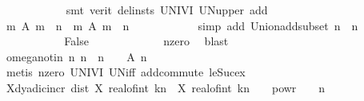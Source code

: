 \begin{isabellebody}
\ \ \ \ \ \ \ \ \ \ \isamarkupfalse%
\ {\isacharparenleft}{\kern0pt}smt\ {\isacharparenleft}{\kern0pt}verit{\isacharcomma}{\kern0pt}\ del{\isacharunderscore}{\kern0pt}insts{\isacharparenright}{\kern0pt}\ UNIV{\isacharunderscore}{\kern0pt}I\ UN{\isacharunderscore}{\kern0pt}upper\ add{\isacharunderscore}{\kern0pt}{}{\isacharparenright}{\kern0pt}\isanewline
\ \ \ \ \ \ \ \ \isamarkupfalse%
\ \isamarkupfalse%
\ {\isachardoublequoteopen}{\isacharparenleft}{\kern0pt}{\isasymUnion}m{\isachardot}{\kern0pt}\ A\ {\isacharparenleft}{\kern0pt}m\ {\isacharplus}{\kern0pt}\ n{\isacharparenright}{\kern0pt}{\isacharparenright}{\kern0pt}\ {\isasymsubseteq}\ {\isacharparenleft}{\kern0pt}{\isasymUnion}m{\isachardot}{\kern0pt}\ A\ {\isacharparenleft}{\kern0pt}m\ {\isacharplus}{\kern0pt}\ n\isanewline
\ \ \ \ \ \ \ \ \ \ \isamarkupfalse%
\ {\isacharparenleft}{\kern0pt}simp\ add{\isacharcolon}{\kern0pt}\ Union{\isacharunderscore}{\kern0pt}add{\isacharunderscore}{\kern0pt}subset\ {\isacartoucheopen}n\ {\isasymle}\ n{\isacartoucheclose}{\isacharparenright}{\kern0pt}\isanewline
\ \ \ \ \ \ \ \ \isamarkupfalse%
\ \isamarkupfalse%
\ False\isanewline
\ \ \ \ \ \ \ \ \ \ \isamarkupfalse%
\ {\isasymomega}\ n{\isacharunderscore}{\kern0pt}zero\ \isamarkupfalse%
\ blast\isanewline
\ \ \ \ \ \ \isamarkupfalse%
\isanewline
\ \ \ \ \ \ \isamarkupfalse%
\ omega{\isacharunderscore}{\kern0pt}notin{\isacharcolon}{\kern0pt}\ {\isachardoublequoteopen}{\isasymAnd}n{\isachardot}{\kern0pt}\ n\ {\isasymge}\ n\ {\isasymLongrightarrow}\ {\isasymomega}\ {\isasymnotin}\ A\ n{\isachardoublequoteclose}\isanewline
\ \ \ \ \ \ \ \ \isamarkupfalse%
\ {\isacharparenleft}{\kern0pt}metis\ n{\isacharunderscore}{\kern0pt}zero\ UNIV{\isacharunderscore}{\kern0pt}I\ UN{\isacharunderscore}{\kern0pt}iff\ add{\isachardot}{\kern0pt}commute\ le{\isacharunderscore}{\kern0pt}Suc{\isacharunderscore}{\kern0pt}ex{\isacharparenright}{\kern0pt}\isanewline
\ \ \ \ \ \ \isamarkupfalse%
\ \isamarkupfalse%
\ X{\isacharunderscore}{\kern0pt}dyadic{\isacharunderscore}{\kern0pt}incr{\isacharcolon}{\kern0pt}\ {\isachardoublequoteopen}dist\ {\isacharparenleft}{\kern0pt}X\ {\isacharparenleft}{\kern0pt}{\isacharparenleft}{\kern0pt}real{\isacharunderscore}{\kern0pt}of{\isacharunderscore}{\kern0pt}int\ k{\isacharminus}{\kern0pt}{}{\isacharparenright}{\kern0pt}{\isacharslash}{\kern0pt}{}{\isacharcircum}{\kern0pt}n{\isacharparenright}{\kern0pt}\ {\isasymomega}{\isacharparenright}{\kern0pt}\ {\isacharparenleft}{\kern0pt}X\ {\isacharparenleft}{\kern0pt}real{\isacharunderscore}{\kern0pt}of{\isacharunderscore}{\kern0pt}int\ k{\isacharslash}{\kern0pt}{}{\isacharcircum}{\kern0pt}n{\isacharparenright}{\kern0pt}\ {\isasymomega}{\isacharparenright}{\kern0pt}\ {\isacharless}{\kern0pt}\ {}\ powr\ {\isacharparenleft}{\kern0pt}{\isacharminus}{\kern0pt}\ {\isasymgamma}\ {\isacharasterisk}{\kern0pt}\ n{\isacharparenright}{\kern0pt}{\isachardoublequoteclose}\isanewline

\end{isabellebody}
